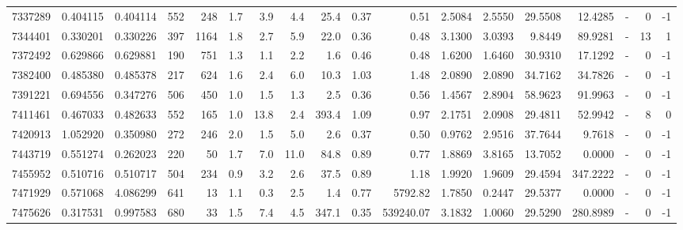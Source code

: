 \begin{tabular}{rrrrrrrrrrrrrrrlrr}
   7337289 & 0.404115 &   0.404114 &  552 &  248 &      1.7 &      3.9 &     4.4 &     25.4 &       0.37 &        0.51 &  2.5084 &  2.5550 &   29.5508 &   12.4285 &             - &        0 &         -1 \\
   7344401 & 0.330201 &   0.330226 &  397 & 1164 &      1.8 &      2.7 &     5.9 &     22.0 &       0.36 &        0.48 &  3.1300 &  3.0393 &    9.8449 &   89.9281 &             - &       13 &          1 \\
   7372492 & 0.629866 &   0.629881 &  190 &  751 &      1.3 &      1.1 &     2.2 &      1.6 &       0.46 &        0.48 &  1.6200 &  1.6460 &   30.9310 &   17.1292 &             - &        0 &         -1 \\
   7382400 & 0.485380 &   0.485378 &  217 &  624 &      1.6 &      2.4 &     6.0 &     10.3 &       1.03 &        1.48 &  2.0890 &  2.0890 &   34.7162 &   34.7826 &             - &        0 &         -1 \\
   7391221 & 0.694556 &   0.347276 &  506 &  450 &      1.0 &      1.5 &     1.3 &      2.5 &       0.36 &        0.56 &  1.4567 &  2.8904 &   58.9623 &   91.9963 &             - &        0 &         -1 \\
   7411461 & 0.467033 &   0.482633 &  552 &  165 &      1.0 &     13.8 &     2.4 &    393.4 &       1.09 &        0.97 &  2.1751 &  2.0908 &   29.4811 &   52.9942 &             - &        8 &          0 \\
   7420913 & 1.052920 &   0.350980 &  272 &  246 &      2.0 &      1.5 &     5.0 &      2.6 &       0.37 &        0.50 &  0.9762 &  2.9516 &   37.7644 &    9.7618 &             - &        0 &         -1 \\
   7443719 & 0.551274 &   0.262023 &  220 &   50 &      1.7 &      7.0 &    11.0 &     84.8 &       0.89 &        0.77 &  1.8869 &  3.8165 &   13.7052 &    0.0000 &             - &        0 &         -1 \\
   7455952 & 0.510716 &   0.510717 &  504 &  234 &      0.9 &      3.2 &     2.6 &     37.5 &       0.89 &        1.18 &  1.9920 &  1.9609 &   29.4594 &  347.2222 &             - &        0 &         -1 \\
   7471929 & 0.571068 &   4.086299 &  641 &   13 &      1.1 &      0.3 &     2.5 &      1.4 &       0.77 &     5792.82 &  1.7850 &  0.2447 &   29.5377 &    0.0000 &             - &        0 &         -1 \\
   7475626 & 0.317531 &   0.997583 &  680 &   33 &      1.5 &      7.4 &     4.5 &    347.1 &       0.35 &   539240.07 &  3.1832 &  1.0060 &   29.5290 &  280.8989 &             - &        0 &         -1 \\

\end{tabular}
